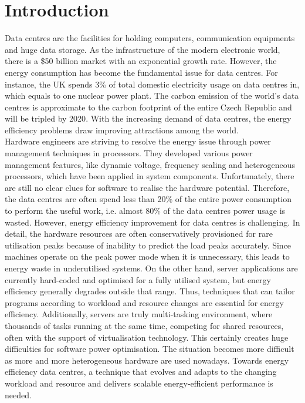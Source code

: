\documentclass[11pt]{article}
\begin{document}
\section{Introduction}\label{ch:overview}
Data centres are the facilities for holding computers, communication equipments and huge data storage. As the infrastructure of the modern electronic world, there is a \$50 billion market with an exponential growth rate\cite{bigdatacentre}. However, the energy consumption has become the fundamental issue for data centres\cite{EPAreport}\cite{Energygov}. For instance, the UK spends 3\% of total domestic electricity usage on data centres in, which equals to one nuclear power plant\cite{globalactionplan}. The carbon emission of the world’s data centres is approximate to the carbon footprint of the entire Czech Republic and will be tripled by 2020\cite{GeSI}. With the increasing demand of data centres, the energy efficiency problems draw improving attractions among the world.
\\
\linebreak
Hardware engineers are striving to resolve the energy issue through power management techniques in processors\cite{chanandopp}. They developed various power management features, like dynamic voltage, frequency scaling and heterogeneous processors, which have been applied in system components. Unfortunately, there are still no clear clues for software to realise the hardware potential\cite{lookbackandfor}\cite{towardsenergyeff}. Therefore, the data centres are often spend less than 20\% of the entire power consumption to perform the useful work, i.e. almost 80\% of the data centres power usage is wasted\cite{thecaseforepc}. 
However, energy efficiency improvement for data centres is challenging. In detail, the hardware resources are often conservatively provisioned for rare utilisation peaks because of inability to predict the load peaks accurately\cite{energy-aware}\cite{towardsenergyeff}. Since machines operate on the peak power mode when it is unnecessary, this leads to energy waste in underutilised systems. On the other hand, server applications are currently hard-coded and optimised for a fully utilised system, but energy efficiency generally degrades outside that range\cite{towardsenergyeff}\cite{autodatacentre}. Thus, techniques that can tailor programs according to workload and resource changes are essential for energy efficiency\cite{towardsenergyeff}. Additionally, servers are truly multi-tasking environment, where thousands of tasks running at the same time, competing for shared resources, often with the support of virtualisation technology\cite{energy-effcloud}. This certainly creates huge difficulties for software power optimisation. The situation becomes more difficult as more and more heterogeneous hardware are used nowadays\cite{aview}. Towards energy efficiency data centres, a technique that evolves and adapts to the changing workload and resource and delivers scalable energy-efficient performance is needed.
\end{document}
